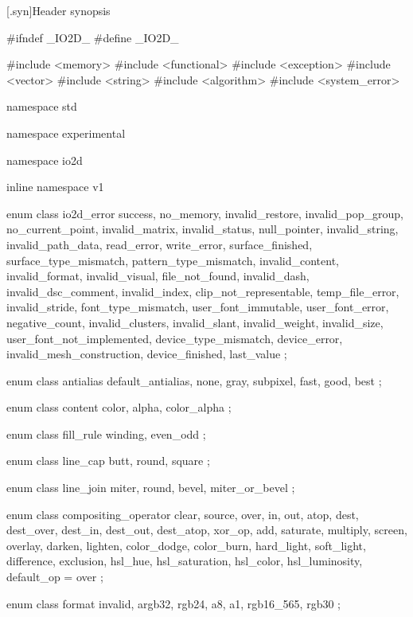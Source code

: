 [\iotwod.syn]{Header  synopsis}

%
\begin{codeblock}
#ifndef _IO2D_
#define _IO2D_

#include <memory>
#include <functional>
#include <exception>
#include <vector>
#include <string>
#include <algorithm>
#include <system_error>

namespace std { namespace experimental { namespace io2d { inline namespace v1 {
  enum class io2d_error {
    success,
    no_memory,
    invalid_restore,
    invalid_pop_group,
    no_current_point,
    invalid_matrix,
    invalid_status,
    null_pointer,
    invalid_string,
    invalid_path_data,
    read_error,
    write_error,
    surface_finished,
    surface_type_mismatch,
    pattern_type_mismatch,
    invalid_content,
    invalid_format,
    invalid_visual,
    file_not_found,
    invalid_dash,
    invalid_dsc_comment,
    invalid_index,
    clip_not_representable,
    temp_file_error,
    invalid_stride,
    font_type_mismatch,
    user_font_immutable,
    user_font_error,
    negative_count,
    invalid_clusters,
    invalid_slant,
    invalid_weight,
    invalid_size,
    user_font_not_implemented,
    device_type_mismatch,
    device_error,
    invalid_mesh_construction,
    device_finished,
    last_value
  };

  enum class antialias {
    default_antialias,
    none,
    gray,
    subpixel,
    fast,
    good,
    best
  };

  enum class content {
    color,
    alpha,
    color_alpha
  };

  enum class fill_rule {
    winding,
    even_odd
  };

  enum class line_cap {
    butt,
    round,
    square
  };

  enum class line_join {
    miter,
    round,
    bevel,
    miter_or_bevel
  };

  enum class compositing_operator {
    clear,
    source,
    over,
    in,
    out,
    atop,
    dest,
    dest_over,
    dest_in,
    dest_out,
    dest_atop,
    xor_op,
    add,
    saturate,
    multiply,
    screen,
    overlay,
    darken,
    lighten,
    color_dodge,
    color_burn,
    hard_light,
    soft_light,
    difference,
    exclusion,
    hsl_hue,
    hsl_saturation,
    hsl_color,
    hsl_luminosity,
    default_op = over
  };

  enum class format {
    invalid,
    argb32,
    rgb24,
    a8,
    a1,
    rgb16_565,
    rgb30
  };

}}}}
\end{codeblock}
